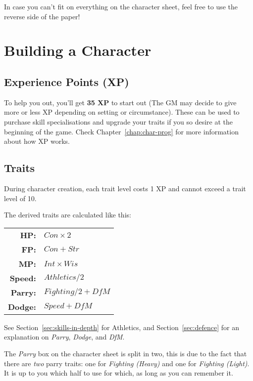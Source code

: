\begin{note} 
    In case you can't fit on everything on the character sheet, feel free to use the reverse side of the paper!
\end{note}

\section{Building a Character}
\subsection{Experience Points (XP)}
To help you out, you'll get \textbf{35 XP} to start out (The GM may decide to give more or less XP depending on setting or circumstance).
These can be used to purchase skill specialisations and upgrade your traits if you so desire at the beginning of the game.
Check Chapter~\ref{chap:char-prog} for more information about how XP works.

\subsection{Traits}
During character creation, each trait level costs 1 XP and cannot exceed a trait level of 10.

The derived traits are calculated like this:
\begin{center}
\begin{tabular} {r | l} 
\textbf{HP:} & $Con \times 2$ \\
\textbf{FP:} & $Con + Str$ \\
\textbf{MP:} & $Int \times Wis$ \\
\textbf{Speed:} & $Athletics / 2$\\
\textbf{Parry:} & $Fighting / 2 + \mathit{DfM}$\\
\textbf{Dodge:} & $Speed + \mathit{DfM}$ \\
\end{tabular}
\end{center}
See Section~\ref{sec:skills-in-depth} for Athletics, and Section~\ref{sec:defence} for an explanation on \textit{Parry}, \textit{Dodge}, and \textit{DfM}.

\begin{note} 
    The \textit{Parry} box on the character sheet is split in two, this is due to the fact that there are \textit{two} parry traits: one for \textit{Fighting (Heavy)} and one for \textit{Fighting (Light)}.
    It is up to you which half to use for which, as long as you can remember it.
\end{note}

